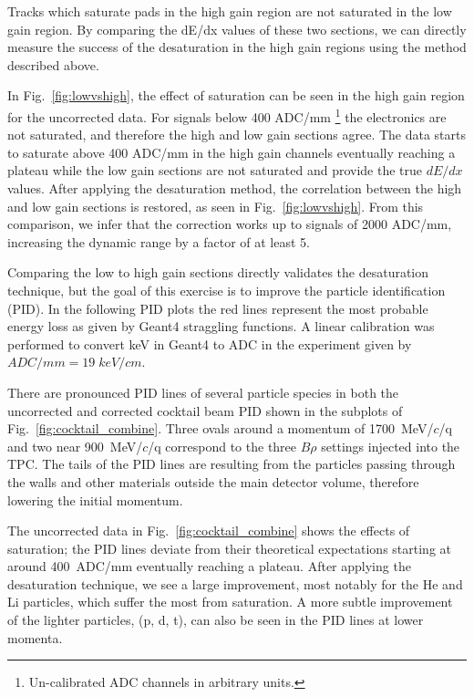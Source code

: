 Tracks which saturate pads in the high gain region are not saturated in the low gain region. By comparing the dE/dx values of these two sections, we can directly measure the success of the desaturation in the high gain regions using the method described above.  
 
In Fig.~\ref{fig:lowvshigh}, the effect of saturation can be seen in the high gain region for the uncorrected data. For signals below 400 ADC/mm \footnote{Un-calibrated ADC channels in arbitrary units.} the electronics are not saturated, and therefore the high and low gain sections agree. The data starts to saturate above 400 ADC/mm in the high gain channels eventually reaching a plateau while the low gain sections are not saturated and provide the true $dE/dx$ values.
 After applying the desaturation method, the correlation between the high and low gain sections is restored, as seen in Fig.~\ref{fig:lowvshigh}. From this comparison, we infer that the correction works up to signals of 2000 ADC/mm, increasing the dynamic range by a factor of at least 5.


Comparing the low to high gain sections directly validates the desaturation technique, but the goal  of this exercise is to improve the particle identification (PID). In the following PID plots the red lines represent the most probable energy loss as given by Geant4 straggling functions. A linear calibration was performed to convert keV in Geant4 to ADC in the experiment given by $ADC/mm = 19\;keV/cm$.

There are pronounced PID lines of several particle species in both the uncorrected and corrected cocktail beam PID shown in the subplots of Fig.~\ref{fig:cocktail_combine}. Three ovals around a momentum of 1700~MeV/$c$/q and two near 900~MeV/$c$/q correspond to the three $B\rho$ settings injected into the TPC. The tails of the PID lines are resulting from the particles passing through the walls and other materials outside the main detector volume, therefore lowering the initial momentum. 

The uncorrected data in Fig.~\ref{fig:cocktail_combine} shows the effects of saturation; the PID lines deviate from their theoretical expectations starting at around 400~ADC/mm eventually reaching a plateau. After applying the desaturation technique, we see a large improvement, most notably for the He and Li particles, which suffer the most from saturation. A more subtle improvement of the lighter particles, (p, d, t), can also be seen in the PID lines at lower momenta.

